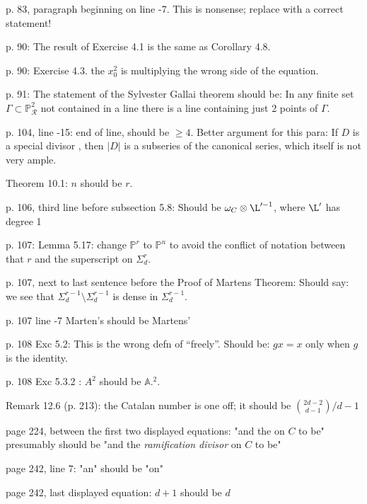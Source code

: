 \documentclass[twoside,12pt, leqno]{amsart}
\def\PP{{\mathbb P}}
\def\RR{{\mathcal R}}
\begin{document}
p. 83, paragraph beginning on line -7. This is nonsense; replace with a correct statement!

p. 90: The result of Exercise 4.1 is the same as Corollary 4.8.


p. 90: Exercise 4.3. the $x_0^2$ is multiplying the wrong side of the equation.

p. 91: The statement of the Sylvester Gallai theorem should be:
In any finite set $\Gamma\subset \PP^2_\RR$ not contained in a line
there is a line containing just 2 points of $\Gamma$.

p. 104, line -15: end of line, should be $\geq 4$. Better argument for this para: If $D$ is a special divisor ,
then $|D|$ is a subseries of the canonical series, which itself is not very ample.

Theorem 10.1: $n$ should be $r$.

p. 106, third line before subsection 5.8: Should be $\omega_C \otimes \L'^{-1}$, where $\L'$ has degree 1

p. 107: Lemma 5.17: change $\PP^r$ to $\PP^n$ to avoid the conflict of notation between that $r$ and
the superscript on $\Sigma^r_d$.

p. 107, next to last sentence before the Proof of Martens Theorem: Should say: we see that
$\Sigma^{r-1}_d \setminus \Sigma^{r-1}_d$ is dense in $\Sigma^{r-1}_d$.

p. 107 line -7 Marten's should be Martens'

p. 108 Exc 5.2: This is the wrong defn of ``freely''. Should be: $gx = x$ only when $g$
is the identity.

p. 108 Exc 5.3.2 : $A^2$ should be $\mathbb A.^2$.


Remark 12.6 (p. 213): the Catalan number is one off; it should be $\binom{2d-2}{d-1}/d-1$

page 224, between the first two displayed equations: "and the on $C$ to be" presumably should be "and the \emph{ramification divisor} on $C$ to be"

page 242, line 7: "an" should be "on"

page 242, last displayed equation: $d+1$ should be $d$



\end{document}
